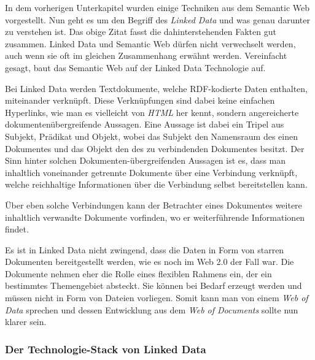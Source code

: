 \documentclass[11pt]{article}
\begin{document}
\noindent
In dem vorherigen Unterkapitel wurden einige Techniken aus dem Semantic Web vorgestellt. Nun geht es um den Begriff des \textit{Linked Data} und was genau darunter zu verstehen ist. Das obige Zitat fasst die dahinterstehenden Fakten gut zusammen. Linked Data und Semantic Web dürfen nicht verwechselt werden, auch wenn sie oft im gleichen Zusammenhang erwähnt werden. Vereinfacht gesagt, baut das Semantic Web auf der Linked Data Technologie auf.

Bei Linked Data werden Textdokumente, welche RDF-kodierte Daten enthalten, miteinander verknüpft. Diese Verknüpfungen sind dabei keine einfachen Hyperlinks, wie man es vielleicht von \textit{HTML} her kennt, sondern angereicherte dokumentenübergreifende Aussagen. Eine Aussage ist dabei ein Tripel aus Subjekt, Prädikat und Objekt, wobei das Subjekt den Namensraum des einen Dokumentes und das Objekt den des zu verbindenden Dokumentes besitzt. Der Sinn hinter solchen Dokumenten-übergreifenden Aussagen ist es, dass man inhaltlich voneinander getrennte Dokumente über eine Verbindung verknüpft, welche reichhaltige Informationen über die Verbindung selbst bereitstellen kann. 

\newpage
\noindent
Über eben solche Verbindungen kann der Betrachter eines Dokumentes weitere inhaltlich verwandte Dokumente vorfinden, wo er weiterführende Informationen findet.

Es ist in Linked Data nicht zwingend, dass die Daten in Form von starren Dokumenten bereitgestellt werden, wie es noch im Web 2.0 der Fall war. Die Dokumente nehmen eher die Rolle eines flexiblen Rahmens ein, der ein bestimmtes Themengebiet absteckt. Sie können bei Bedarf erzeugt werden und müssen nicht in Form von Dateien vorliegen. Somit kann man von einem \textit{Web of Data} sprechen und dessen Entwicklung aus dem \textit{Web of Documents} sollte nun klarer sein. \cite{LINKEDDATA-ABOUT}


%
%
\subsubsection{Der Technologie-Stack von Linked Data}
\end{document}

